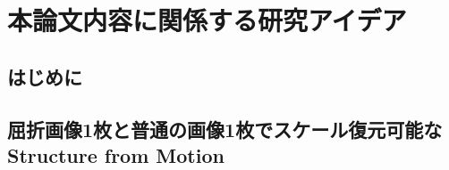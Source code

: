 \chapter{本論文内容に関係する研究アイデア}
\setcounter{page}{1}
\renewcommand{\thepage}{C--\arabic{page}}

\thispagestyle{empty}

\newpage

\section{はじめに}



\newpage

\section{屈折画像1枚と普通の画像1枚でスケール復元可能なStructure from Motion}



\newpage



